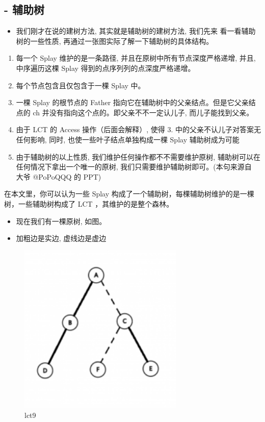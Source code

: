 \subsection{- 辅助树}

\begin{itemize}
\item 我们刚才在说的建树方法, 其实就是辅助树的建树方法, 我们先来 看⼀看辅助树的一些性质, 再通过一张图实际了解一下辅助树的具体结构。
\end{itemize}

\begin{enumerate}
\item 每⼀个 Splay 维护的是一条路径, 并且在原树中所有节点深度严格递增, 并且, 中序遍历这棵 Splay 得到的点序列列的点深度严格递增。
\item 每个节点包含且仅包含于一棵 Splay 中。
\item ⼀棵 Splay 的根节点的 Father 指向它在辅助树中的父亲结点。但是它父亲结点的 ch 并没有指向这个点的。即父亲不不⼀定认⼉子, ⽽⼉子能找到⽗亲。
\item 由于 LCT 的 Access 操作（后面会解释）, 使得 3. 中的⽗亲不认⼉子对答案⽆任何影响, 同时, 也使一些叶⼦结点单独构成一棵 Splay 辅助树成为可能
\item 由于辅助树的以上性质, 我们维护任何操作都不不需要维护原树, 辅助树可以在任何情况下拿出一个唯一的原树, 我们只需要维护辅助树即可。(本句来源自 大爷 @PoPoQQQ 的 PPT)
\end{enumerate}

在本文里，你可以认为一些 Splay 构成了一个辅助树，每棵辅助树维护的是一棵树，一些辅助树构成了 LCT ，其维护的是整个森林。

\begin{itemize}
\item 现在我们有⼀棵原树, 如图。 
\item 加粗边是实边, 虚线边是虚边
\end{itemize}

\begin{figure}[htbp]
\centering
\includegraphics[width=0.7\textwidth]{docs/ds/images/lct9.png} 
\caption{lct9}
\end{figure}

